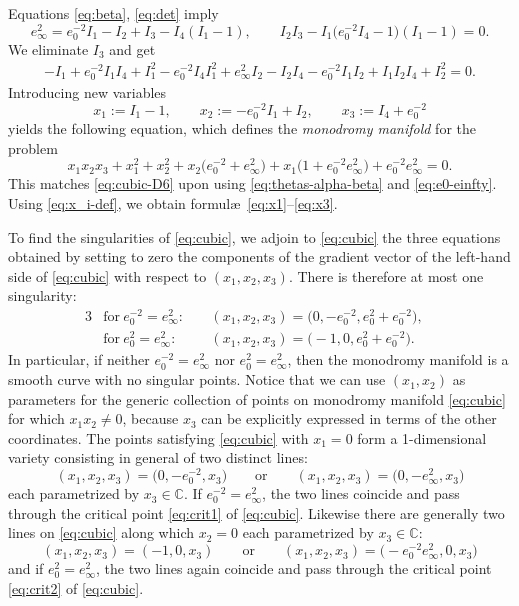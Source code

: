 \documentclass[pdftex]{sigma}
\numberwithin{equation}{section}
\begin{document}
Equations \eqref{eq:beta}, \eqref{eq:det} imply
\begin{equation*}
 e_\infty^2 =e_0^{-2} I_1-I_2+I_3-I_4(I_1-1),\qquad I_2I_3-I_1\big(e_0^{-2} I_4-1\big)(I_1-1)=0.
\end{equation*}
We eliminate $I_3$ and get
\begin{gather*}
 -I_1+e_0^{-2} I_1 I_4+I_1^2-e_0^{-2} I_4 I_1^2+e_\infty^2 I_2- I_2I_4 -e_0^{-2}I_1I_2+I_1I_2I_4+I_2^2=0.
\end{gather*}
Introducing new variables
\begin{equation}
x_1:=I_1-1,\qquad x_2:=-e_0^{-2} I_1+I_2,\qquad x_3:=I_4+e_0^{-2}
\label{eq:x_i-def}
\end{equation}
yields the following equation, which defines the \emph{monodromy manifold} for the problem
\begin{equation}
 \label{eq:cubic} x_1x_2x_3+x_1^2+x_2^2+x_2\big(e_0^{-2}+e_\infty^2\big)+x_1\big(1+e^{-2}_0 e^{2}_\infty\big)+e^{-2}_0e^{2}_\infty=0.
\end{equation}
This matches \eqref{eq:cubic-D6} upon using \eqref{eq:thetas-alpha-beta} and \eqref{eq:e0-einfty}. Using \eqref{eq:x_i-def}, we obtain formul\ae\ \eqref{eq:x1}--\eqref{eq:x3}.

To find the singularities of \eqref{eq:cubic}, we adjoin to \eqref{eq:cubic} the three equations obtained by setting to zero the components of the gradient vector of the left-hand side of \eqref{eq:cubic} with respect to $(x_1,x_2,x_3)$. There is therefore at most one singularity:
\begin{alignat}{3}\label{eq:crit1}
 &\text{for}\ e^{-2}_0=e^2_\infty\colon\ &&(x_1,x_2,x_3)=\big(0,-e^{-2}_0,e^{2}_0+e_0^{-2}\big),&\\
 &\text{for}\ e^{2}_0=e_\infty^{2}\colon\ &&(x_1,x_2,x_3)=\bigl(-1,0,e^{2}_0+e_0^{-2}\bigr).&\label{eq:crit2}
\end{alignat}
In particular, if neither $e^{-2}_0=e^2_\infty$ nor $e^{2}_0=e^2_\infty$, then the monodromy manifold is a smooth curve with no singular points.
Notice that we can use $(x_1,x_2)$ as parameters for the generic collection of points on monodromy manifold \eqref{eq:cubic} for which $x_1x_2\neq 0$, because $x_3$ can be explicitly expressed in terms of the other coordinates. The points satisfying \eqref{eq:cubic} with $x_1=0$ form a 1-dimensional variety consisting in general of two distinct lines:
\begin{equation*}
 (x_1,x_2,x_3)=\big(0,-e^{-2}_0,x_3\big)\qquad\text{or}\qquad (x_1,x_2,x_3)=\big(0,-e^2_\infty,x_3\big)
\end{equation*}
each parametrized by $x_3\in\mathbb{C}$. If $e_0^{-2}=e_\infty^2$, the two lines coincide and pass through the critical point \eqref{eq:crit1} of \eqref{eq:cubic}. Likewise there are generally two lines on \eqref{eq:cubic} along which $x_2=0$ each parametrized by $x_3\in\mathbb{C}$:
\begin{equation*}
 (x_1,x_2,x_3)=(-1,0,x_3)\qquad\text{or}\qquad (x_1,x_2,x_3)=\bigl(-e^{-2}_0e^2_\infty,0,x_3\bigr)
\end{equation*}
and if $e^{2}_0=e_\infty^{2}$, the two lines again coincide and pass through the critical point \eqref{eq:crit2} of \eqref{eq:cubic}.
\end{document}
